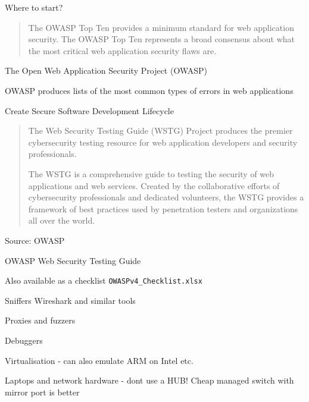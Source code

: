 \documentclass[Screen16to9,17pt]{foils}
\begin{document}
\vskip 2cm
\centerline{\LARGE Where to start?}




\begin{quote}
The OWASP Top Ten provides a minimum standard for web application
security. The OWASP Top Ten represents a broad consensus about what
the most critical web application security flaws are.
\end{quote}

\begin{list1}
\item The Open Web Application Security Project (OWASP)
\item OWASP produces lists of the most common types of errors in web applications
\item {}
\item Create Secure Software Development Lifecycle
\end{list1}





\begin{quote}
  The Web Security Testing Guide (WSTG) Project produces the premier cybersecurity testing resource for web application developers and security professionals.

  The WSTG is a comprehensive guide to testing the security of web applications and web services. Created by the collaborative efforts of cybersecurity professionals and dedicated volunteers, the WSTG provides a framework of best practices used by penetration testers and organizations all over the world.
\end{quote}
Source: OWASP

\begin{list2}
  \item OWASP Web Security Testing Guide\\
  \item Also available as a checklist \verb+OWASPv4_Checklist.xlsx+
\end{list2}





\begin{list2}
\item Sniffers Wireshark and similar tools
\item Proxies and fuzzers
\item Debuggers
\item Virtualisation - can also emulate ARM on Intel etc.
\item Laptops and network hardware - dont use a HUB! Cheap managed switch with mirror port is better
\end{list2}
\end{document}
